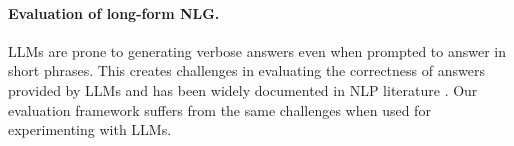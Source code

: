 \paragraph{Evaluation of long-form NLG.} LLMs are prone to generating verbose answers even when prompted to answer in short phrases. This creates challenges in evaluating the correctness of answers provided by LLMs and has been widely documented in NLP literature \cite{chang2023booookscore, xu2023critical, krishna2023longeval}. Our evaluation framework suffers from the same challenges when used for experimenting with LLMs.

